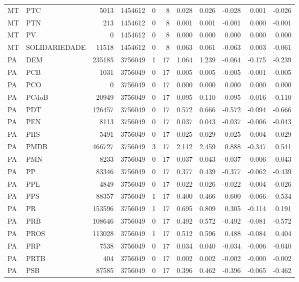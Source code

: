 \begin{landscape}
\begin{longtable}{llrrrrrrrrr}
MT & PTC & 5013 & 1454612 & 0 & 8 & 0.028 & 0.026 & -0.028 & 0.001 & -0.026 \\
MT & PTN & 213 & 1454612 & 0 & 8 & 0.001 & 0.001 & -0.001 & 0.000 & -0.001 \\
MT & PV & 0 & 1454612 & 0 & 8 & 0.000 & 0.000 & 0.000 & 0.000 & 0.000 \\
MT & SOLIDARIEDADE & 11518 & 1454612 & 0 & 8 & 0.063 & 0.061 & -0.063 & 0.003 & -0.061 \\
PA & DEM & 235185 & 3756049 & 1 & 17 & 1.064 & 1.239 & -0.064 & -0.175 & -0.239 \\
PA & PCB & 1031 & 3756049 & 0 & 17 & 0.005 & 0.005 & -0.005 & -0.001 & -0.005 \\
PA & PCO & 0 & 3756049 & 0 & 17 & 0.000 & 0.000 & 0.000 & 0.000 & 0.000 \\
PA & PCdoB & 20949 & 3756049 & 0 & 17 & 0.095 & 0.110 & -0.095 & -0.016 & -0.110 \\
PA & PDT & 126457 & 3756049 & 0 & 17 & 0.572 & 0.666 & -0.572 & -0.094 & -0.666 \\
PA & PEN & 8113 & 3756049 & 0 & 17 & 0.037 & 0.043 & -0.037 & -0.006 & -0.043 \\
PA & PHS & 5491 & 3756049 & 0 & 17 & 0.025 & 0.029 & -0.025 & -0.004 & -0.029 \\
PA & PMDB & 466727 & 3756049 & 3 & 17 & 2.112 & 2.459 & 0.888 & -0.347 & 0.541 \\
PA & PMN & 8233 & 3756049 & 0 & 17 & 0.037 & 0.043 & -0.037 & -0.006 & -0.043 \\
PA & PP & 83346 & 3756049 & 0 & 17 & 0.377 & 0.439 & -0.377 & -0.062 & -0.439 \\
PA & PPL & 4849 & 3756049 & 0 & 17 & 0.022 & 0.026 & -0.022 & -0.004 & -0.026 \\
PA & PPS & 88357 & 3756049 & 1 & 17 & 0.400 & 0.466 & 0.600 & -0.066 & 0.534 \\
PA & PR & 153596 & 3756049 & 1 & 17 & 0.695 & 0.809 & 0.305 & -0.114 & 0.191 \\
PA & PRB & 108646 & 3756049 & 0 & 17 & 0.492 & 0.572 & -0.492 & -0.081 & -0.572 \\
PA & PROS & 113028 & 3756049 & 1 & 17 & 0.512 & 0.596 & 0.488 & -0.084 & 0.404 \\
PA & PRP & 7538 & 3756049 & 0 & 17 & 0.034 & 0.040 & -0.034 & -0.006 & -0.040 \\
PA & PRTB & 404 & 3756049 & 0 & 17 & 0.002 & 0.002 & -0.002 & -0.000 & -0.002 \\
PA & PSB & 87585 & 3756049 & 0 & 17 & 0.396 & 0.462 & -0.396 & -0.065 & -0.462 \\

\end{longtable}
\end{landscape}
